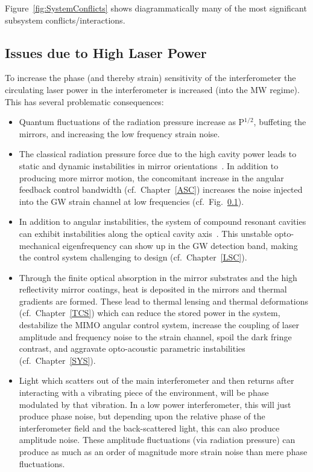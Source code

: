 Figure~\ref{fig:SystemConflicts} shows diagrammatically many of the most
significant subsystem conflicts/interactions.

\subsection{Issues due to High Laser Power}
To increase the phase (and thereby strain) sensitivity of the interferometer
the circulating laser power in the interferometer is increased (into the MW
regime). This has several problematic consequences:
\begin{itemize}
\item Quantum fluctuations of the radiation pressure increase as P$^{1/2}$,
  buffeting the mirrors, and increasing the low frequency strain noise.
\item The classical radiation pressure force due to the high cavity
  power leads to static and dynamic instabilities in mirror
  orientations~\cite{Sidles:2006un, Dooley:13, aLIGO:ASC}. In addition
  to producing more mirror motion, the concomitant increase in the angular feedback control bandwidth (cf.~Chapter~\ref{ASC}) increases the noise injected into the GW strain channel at low frequencies (cf.~Fig.~\ref{}).
\item In addition to angular instabilities, the system of compound
  resonant cavities can exhibit instabilities along the optical cavity
  axis~\cite{SGLMW2004, BuCh2002, Osamu:spring}. This unstable opto-mechanical eigenfrequency can show up in the GW detection band, making the control system challenging to design (cf.~Chapter~\ref{LSC}).
\item Through the finite optical absorption in the mirror substrates
  and the high reflectivity mirror coatings, heat is deposited in the
  mirrors and thermal gradients are formed. These lead to thermal
  lensing and thermal deformations (cf.~Chapter~\ref{TCS}) which can
  reduce the stored power in the system, destabilize the MIMO angular
  control system, increase the coupling of laser amplitude and
  frequency noise to the strain channel, spoil the dark fringe
  contrast, and aggravate opto-acoustic parametric instabilities (cf.~Chapter~\ref{SYS}).
\item Light which scatters out of the main interferometer and then returns
  after interacting with a vibrating piece of the environment, will be phase
  modulated by that vibration. In a low power interferometer, this will just
  produce phase noise, but depending upon the relative phase of the
  interferometer field and the back-scattered light, this can also produce
  amplitude noise. These amplitude fluctuations (via radiation pressure) can
  produce as much as an order of magnitude more strain noise than mere
  phase fluctuations.

\end{itemize}

